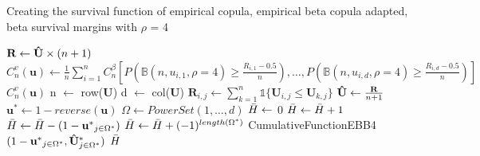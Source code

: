 \documentclass[12pt]{report}
\newcommand{\1}{\mathbf{1}}
\begin{document}
\begin{flushleft}
\begin{algorithm}[H]
\caption{Creating the survival function of empirical copula, empirical beta copula adapted, beta survival margins with $\rho$ = 4}
\begin{algorithmic}
 
    \State $\textbf{R} \gets \mathbf{\Hat{U}} \times (n + 1)$
    \State $C^{v}_{n}(\textbf{u}) \gets \frac{1}{n}\sum\limits_{i = 1}^{n} C_{n}^{\beta} \left[P\left(\mathbb{B}(n, u_{i,1}, \rho = 4) \ge \frac{R_{i,1} - 0.5}{n}\right), \dots, P\left(\mathbb{B}(n, u_{i,d}, \rho = 4) \ge \frac{R_{i,d} - 0.5}{n}\right)\right]$
    \State \Return $C^{v}_{n}(\textbf{u})$
\EndProcedure
{}
    \State n $\gets$ row($\mathbf{U}$)
    \State d $\gets$ col($\mathbf{U}$)
            \State $\textbf{R}_{i,j} \gets \sum\limits_{k = 1}^{n} \mathds{1} \{ \textbf{U}_{i,j} \le \textbf{U}_{k,j} \}$
        \EndFor
    \EndFor
    \State $\mathbf{\Hat{U}} \gets \frac{\mathbf{R}}{n + 1}$ 
    \State $\mathbf{u^{*}} \gets 1 - reverse(\textbf{u})$ 
    \State $\Omega \gets PowerSet(1, \dots, d)$ 
    \State $\Bar{H} \gets$ 0 
            \State $\Bar{H} \gets \Bar{H} + 1$
            \State $\Bar{H} \gets \Bar{H} - (1 - \mathbf{u^{*}}_{j \in \Omega^{*}})$ 
        \Else
            \State $\Bar{H} \gets \Bar{H} + (-1)^{length(\Omega^{*})}$ CumulativeFunctionEBB4$(1 - \mathbf{u^{*}}_{j \in \Omega^{*}}, \mathbf{\Hat{U}^{*}}_{j \in \Omega^{*}}) $
        \EndIf
    \EndFor
    \State \Return $\Bar{H}$
\EndProcedure
\end{algorithmic}
\end{algorithm}


\end{flushleft}
\end{document}
